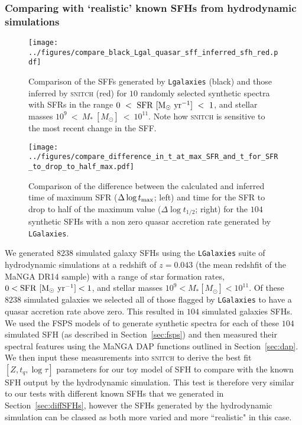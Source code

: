 \documentclass[useAMS,usenatbib]{mn2e}
\begin{document}
\subsubsection{Comparing with `realistic' known SFHs from hydrodynamic simulations}\label{sec:lgalaxies}

\begin{figure}
\centering
\texttt{[image: ../figures/compare\_black\_Lgal\_quasar\_sff\_inferred\_sfh\_red.pdf]}
\caption{Comparison of the SFFs generated by \texttt{Lgalaxies} (black) and those inferred by \textsc{snitch} (red) for $10$ randomly selected synthetic spectra with SFRs in the range $0~<~\rm{SFR}~[M_{\odot}~\rm{yr}^{-1}]~<~1$, and stellar masses $10^9~<~M_{*}~[M_{\odot}]~<~10^{11}$. Note how \textsc{snitch} is sensitive to the most recent change in the SFF.}
\label{fig:lgalsfhs}
\end{figure}

\begin{figure}
\centering
\texttt{[image: ../figures/compare\_difference\_in\_t\_at\_max\_SFR\_and\_t\_for\_SFR\_to\_drop\_to\_half\_max.pdf]}
\caption{Comparison of the difference between the calculated and inferred time of maximum SFR ($\Delta \log t_{\rm{max}}$; left) and time for the SFR to drop to half of the maximum value ($\Delta \log t_{1/2}$; right) for the $104$ synthetic SFHs with a non zero quasar accretion rate generated by \texttt{LGalaxies}.}
\label{fig:genlgalsfhs}
\end{figure}

We generated $8238$ simulated galaxy SFHs using the \texttt{LGalaxies} suite of hydrodynamic simulations \citep{henriques15} at a redshift of $z=0.043$ (the mean redshfit of the MaNGA DR14 sample) with a range of star formation rates, $0 < \rm{SFR}~[M_{\odot}~\rm{yr}^{-1}] < 1$, and stellar masses $10^9 < M_{*} [M_{\odot}] < 10^{11}$. Of these $8238$ simulated galaxies we selected all of those flagged by \texttt{LGalaxies} to have a quasar accretion rate above zero. This resulted in $104$ simulated galaxies SFHs. We used the FSPS models of \cite{conroy10} to generate synthetic spectra for each of these $104$ simulated SFH (as described in Section~\ref{sec:fsps}) and then measured their spectral features using the MaNGA DAP functions outlined in Section~\ref{sec:dap}. We then input these measurements into \textsc{snitch} to derive the best fit $[Z, t_q, \log \tau]$ parameters for our toy model of SFH to compare with the known SFH output by the hydrodynamic simulation. This test is therefore very similar to our tests with different known SFHs that we generated in Section~\ref{sec:diffSFHs}, however the SFHs generated by the hydrodynamic simulation can be classed as both more varied and more ``realistic" in this case.
\end{document}
